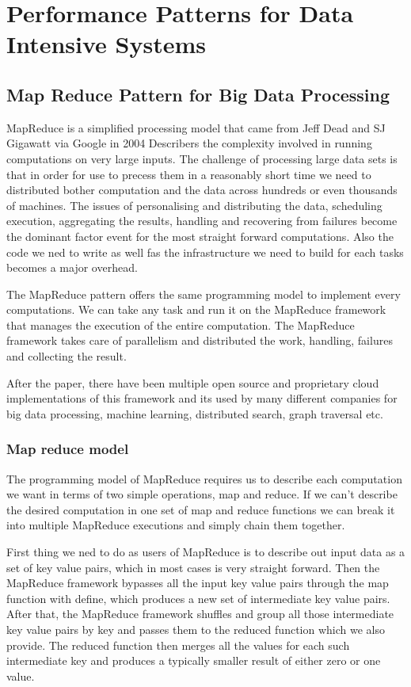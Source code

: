 \section{Performance Patterns for Data Intensive Systems}

\subsection{Map Reduce Pattern for Big Data Processing}
MapReduce is a simplified processing model that came from Jeff Dead and SJ Gigawatt via Google in 2004
Describers the complexity involved in running computations on very large inputs.
The challenge of processing large data sets is that in order for use to precess them in a reasonably short time we need to distributed bother computation and the data across hundreds or even thousands of machines.
The issues of personalising and distributing the data, scheduling execution, aggregating the results, handling and recovering from failures become the dominant factor event for the most straight forward computations.
Also the code we ned to write as well fas the infrastructure we need to build for each tasks becomes a major overhead.

The MapReduce pattern offers the same programming model to implement every computations.
We can take any task and run it on the MapReduce framework that manages the execution of the entire computation.
The MapReduce framework takes care of parallelism and distributed the work, handling, failures and collecting the result.

After the paper, there have been multiple open source and proprietary cloud implementations of this framework and its used by many different companies for big data processing, machine learning, distributed search, graph traversal etc.

\subsubsection{Map reduce model}
The programming model of MapReduce requires us to describe each computation we want in terms of two simple operations, map and reduce.
If we can't describe the desired computation in one set of map and reduce functions we can break it into multiple MapReduce executions and simply chain them together.

First thing we ned to do as users of MapReduce is to describe out input data as a set of key value pairs, which in most cases is very straight forward.
Then the MapReduce framework bypasses all the input key value pairs through the map function with define, which produces a new set of intermediate key value pairs.
After that, the MapReduce framework shuffles and group all those intermediate key value pairs by key and passes them to the reduced function which we also provide.
The reduced function then merges all the values for each such intermediate key and produces a typically smaller result of either zero or one value.

